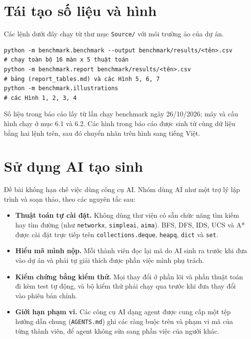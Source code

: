 \section{Tái tạo số liệu và hình}

Các lệnh dưới đây chạy từ thư mục \texttt{Source/} với môi trường ảo của dự án.

\begin{Verbatim}[breaklines=true, fontsize=\footnotesize, frame=single]
python -m benchmark.benchmark --output benchmark/results/<tên>.csv     # chạy toàn bộ 16 màn x 5 thuật toán
python -m benchmark.report benchmark/results/<tên>.csv                 # bảng (report_tables.md) và các Hình 5, 6, 7
python -m benchmark.illustrations                                      # các Hình 1, 2, 3, 4
\end{Verbatim}

Số liệu trong báo cáo lấy từ lần chạy benchmark ngày 26/10/2026; máy và cấu hình chạy ở mục 6.1 và 6.2. Các hình trong báo cáo được sinh từ cùng dữ liệu bằng hai lệnh trên, sau đó chuyển nhãn trên hình sang tiếng Việt.

\section{Sử dụng AI tạo sinh}
\sloppy

Đề bài không hạn chế việc dùng công cụ AI. Nhóm dùng AI như một trợ lý lập trình và soạn thảo, theo các nguyên tắc sau:

\begin{itemize}
\item \textbf{Thuật toán tự cài đặt.} Không dùng thư viện có sẵn chức năng tìm kiếm hay tìm đường (như \texttt{networkx}, \texttt{simpleai}, \texttt{aima}). BFS, DFS, IDS, UCS và A* được cài đặt trực tiếp trên \texttt{collections.deque}, \texttt{heapq}, \texttt{dict} và \texttt{set}.
\item \textbf{Hiểu mã mình nộp.} Mỗi thành viên đọc lại mã do AI sinh ra trước khi đưa vào dự án và phải tự giải thích được phần việc mình phụ trách.
\item \textbf{Kiểm chứng bằng kiểm thử.} Mọi thay đổi ở phần lõi và phần thuật toán đi kèm test tự động, và bộ kiểm thử phải chạy qua trước khi đưa thay đổi vào phiên bản chính.
\item \textbf{Giới hạn phạm vi.} Các công cụ AI dạng agent được cung cấp một tệp hướng dẫn chung (\texttt{AGENTS.md}) ghi các ràng buộc trên và phạm vi mã của từng thành viên, để agent không sửa sang phần việc của người khác.
\end{itemize}

